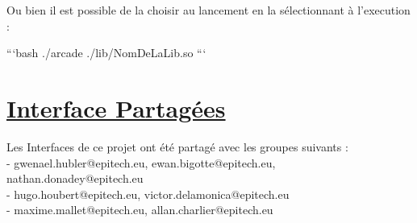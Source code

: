 \documentclass{report}
\begin{document}
\hspace*{-0.5cm}Ou bien il est possible de la choisir au lancement en la sélectionnant à l'execution :

\begin{tcolorbox}[colback=black!75!white]
{\color{white}
\begin{markdown}
```bash
./arcade ./lib/NomDeLaLib.so
```
\end{markdown}
}
\end{tcolorbox}

\section{\underline{Interface Partagées}}

Les Interfaces de ce projet ont été partagé avec les groupes suivants : \\
\hspace*{1cm}- gwenael.hubler@epitech.eu, ewan.bigotte@epitech.eu, nathan.donadey@epitech.eu \\
\hspace*{1cm}- hugo.houbert@epitech.eu, victor.delamonica@epitech.eu \\
\hspace*{1cm}- maxime.mallet@epitech.eu, allan.charlier@epitech.eu \\
\end{document}
